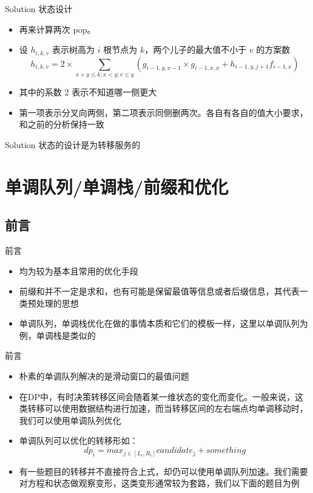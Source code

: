 ﻿\documentclass[aspectratio=169]{ctexbeamer}
\begin{document}
\begin{frame}{Solution}
    状态设计
    \begin{itemize}
        \item 再来计算两次 pop。
        \item 设 $h_{i,k,v}$ 表示树高为 $i$ 根节点为 $k$，两个儿子的最大值不小于 $v$ 的方案数
        $$
            h_{i,k,v}=2\times \sum_{x+y\le k;x<y;v\le y}\left(  g_{i-1,y,x-1}\times g_{i-1,x,x}  + h_{i-1,y,j+1}f_{i-1,x}  \right)
        $$
        \item 其中的系数 $2$ 表示不知道哪一侧更大
        \item 第一项表示分叉向两侧，第二项表示同侧删两次。各自有各自的值大小要求，和之前的分析保持一致
    \end{itemize}
\end{frame}

\begin{frame}{Solution}
    状态的设计是为转移服务的
\end{frame}


\section{单调队列/单调栈/前缀和优化}

\subsection{前言}
\begin{frame}{前言}
    \begin{itemize}
        \item 均为较为基本且常用的优化手段
        \item 前缀和并不一定是求和，也有可能是保留最值等信息或者后缀信息，其代表一类预处理的思想
        \item 单调队列，单调栈优化在做的事情本质和它们的模板一样，这里以单调队列为例，单调栈是类似的
    \end{itemize}
\end{frame}
\begin{frame}{前言}
    \begin{itemize}
        \item 朴素的单调队列解决的是滑动窗口的最值问题
        \item 在DP中，有时决策转移区间会随着某一维状态的变化而变化。一般来说，这类转移可以使用数据结构进行加速，而当转移区间的左右端点均单调移动时，我们可以使用单调队列优化
        \item 单调队列可以优化的转移形如：
        $$
            dp_i=max_{j\in[L_i,R_i]}{candidate_j}+something
        $$
        \item 有一些题目的转移并不直接符合上式，却仍可以使用单调队列加速。我们需要对方程和状态做观察变形，这类变形通常较为套路，我们以下面的题目为例
    \end{itemize}
\end{frame}
\end{document}
